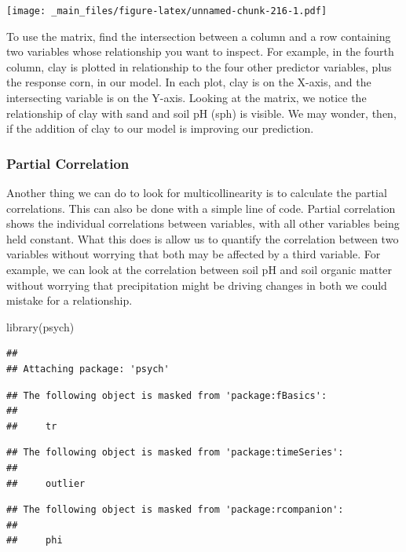 \documentclass[
]{book}
\newenvironment{Shaded}{\begin{snugshade}}{\end{snugshade}}
\newcommand{\FunctionTok}[1]{\textcolor[rgb]{0.00,0.00,0.00}{#1}}
\newcommand{\NormalTok}[1]{#1}
\begin{document}
\texttt{[image: \_main\_files/figure-latex/unnamed-chunk-216-1.pdf]}

To use the matrix, find the intersection between a column and a row containing two variables whose relationship you want to inspect. For example, in the fourth column, clay is plotted in relationship to the four other predictor variables, plus the response corn, in our model. In each plot, clay is on the X-axis, and the intersecting variable is on the Y-axis. Looking at the matrix, we notice the relationship of clay with sand and soil pH (sph) is visible. We may wonder, then, if the addition of clay to our model is improving our prediction.

\hypertarget{partial-correlation}{%
\subsubsection{Partial Correlation}\label{partial-correlation}}

Another thing we can do to look for multicollinearity is to calculate the partial correlations. This can also be done with a simple line of code. Partial correlation shows the individual correlations between variables, with all other variables being held constant. What this does is allow us to quantify the correlation between two variables without worrying that both may be affected by a third variable. For example, we can look at the correlation between soil pH and soil organic matter without worrying that precipitation might be driving changes in both we could mistake for a relationship.

\begin{Shaded}
\begin{Highlighting}[]
\FunctionTok{library}\NormalTok{(psych)}
\end{Highlighting}
\end{Shaded}

\begin{verbatim}
## 
## Attaching package: 'psych'
\end{verbatim}

\begin{verbatim}
## The following object is masked from 'package:fBasics':
## 
##     tr
\end{verbatim}

\begin{verbatim}
## The following object is masked from 'package:timeSeries':
## 
##     outlier
\end{verbatim}

\begin{verbatim}
## The following object is masked from 'package:rcompanion':
## 
##     phi
\end{verbatim}
\end{document}
